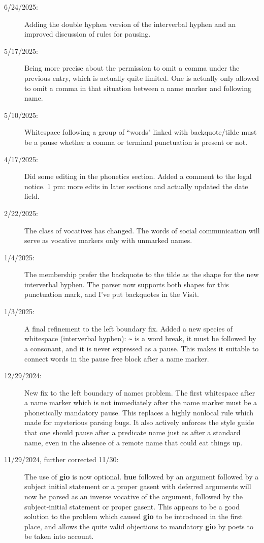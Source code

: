 \documentclass[12pt]{book}
\begin{document}
\begin{description}

\item[6/24/2025:]  Adding the double hyphen version of the interverbal hyphen and an improved discussion of rules for pausing.

\item[5/17/2025:]  Being more precise about the permission to omit a comma under the previous entry, which is actually quite limited.  One is actually only allowed to omit a comma in that situation between a name marker and following name.

\item[5/10/2025:]  Whitespace following a group of ``words" linked with backquote/tilde must be a pause whether a comma or terminal punctuation is present or not.

\item[4/17/2025:]  Did some editing in the phonetics section.  Added a comment to the legal notice.  1 pm:  more edits in later sections and actually updated the date field.

\item[2/22/2025:]  The class of vocatives has changed.  The words of social communication will serve as vocative markers only with unmarked names.

\item[1/4/2025:]  The membership prefer the backquote to the tilde as the shape for the new interverbal hyphen.  The parser now supports both shapes for this punctuation mark, and I've put backquotes in the Visit.

\item[1/3/2025:]  A final refinement to the left boundary fix.  Added a new species of whitespace (interverbal hyphen):  \verb|~| is a word break, it must be followed by a consonant, and it is never expressed as a pause.  This makes it suitable
to connect words in the pause free block after a name marker.

\item[12/29/2024:]  New fix to the left boundary of names problem.  The first whitespace after a name marker which is not immediately after the name marker must be a phonetically mandatory pause.  This replaces a highly nonlocal rule which made for mysterious parsing bugs.  It also actively enforces the style guide that one should pause after a predicate name just as after a standard name, even in the absence of a remote name that could eat things up.

\item[11/29/2024, further corrected 11/30:]  The use of {\bf gio} is now optional.  {\bf hue} followed by an argument followed by a subject initial statement or a proper gasent with deferred arguments will now be parsed as an inverse vocative of the argument, followed by the subject-initial statement or proper gasent.  This appears to be a good solution to the problem which caused {\bf gio} to be introduced in the first place, and allows the quite valid objections to mandatory {\bf gio} by poets to be taken into account.


\end{description}
\end{document}
